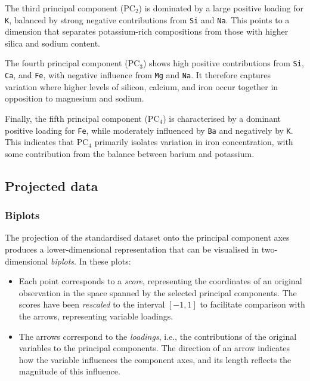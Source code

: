 \documentclass[dtu]{dtuarticle}
\begin{document}
	The third principal component ($\text{PC}_2$) is dominated by a large positive loading for \texttt{K}, balanced by strong negative contributions from \texttt{Si} and \texttt{Na}. This points to a dimension that separates potassium-rich compositions from those with higher silica and sodium content.

	The fourth principal component ($\text{PC}_3$) shows high positive contributions from \texttt{Si}, \texttt{Ca}, and \texttt{Fe}, with negative influence from \texttt{Mg} and \texttt{Na}. It therefore captures variation where higher levels of silicon, calcium, and iron occur together in opposition to magnesium and sodium.

	Finally, the fifth principal component ($\text{PC}_4$) is characterised by a dominant positive loading for \texttt{Fe}, while moderately influenced by \texttt{Ba} and negatively by \texttt{K}. This indicates that $\text{PC}_4$ primarily isolates variation in iron concentration, with some contribution from the balance between barium and potassium.

	\subsection{Projected data}

	\subsubsection{Biplots}

	The projection of the standardised dataset onto the principal component axes produces a lower-dimensional representation that can be visualised in two-dimensional \textit{biplots}. In these plots:

	\begin{itemize}
		\item Each point corresponds to a \textit{score}, representing the coordinates of an original observation in the space spanned by the selected principal components. The scores have been \textit{rescaled} to the interval $[-1,1]$ to facilitate comparison with the arrows, representing variable loadings.
		\item The arrows correspond to the \textit{loadings}, i.e., the contributions of the original variables to the principal components. The direction of an arrow indicates how the variable influences the component axes, and its length reflects the magnitude of this influence.
	\end{itemize}
\end{document}
